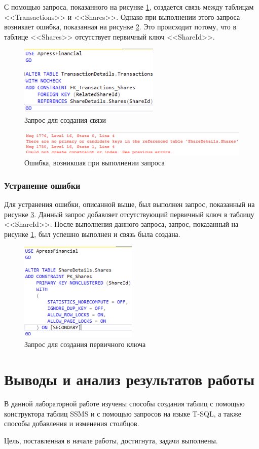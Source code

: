 \documentclass[a4paper, 14pt]{extarticle}
\begin{document}
С помощью запроса, показанного на рисунке \ref{fig:task-7-1}, создается связь
между таблицам <<Transactions>> и <<Shares>>. Однако при выполнении этого запроса
возникает ошибка, показанная на рисунке \ref{fig:task-7-2}. Это происходит
потому, что в таблице <<Shares>> отсутствует первичный ключ <<ShareId>>.

\begin{figure}[H]
  \centering
  \includegraphics[width=0.6\textwidth]{images/task-7/1.png}
  \caption{Запрос для создания связи}
  \label{fig:task-7-1}
\end{figure}

\begin{figure}[H]
  \centering
  \includegraphics[width=\textwidth]{images/task-7/2.png}
  \caption{Ошибка, возникшая при выполнении запроса}
  \label{fig:task-7-2}
\end{figure}

\subsubsection{Устранение ошибки}

Для устранения ошибки, описанной выше, был выполнен запрос, показанный на
рисунке \ref{fig:task-7-3}. Данный запрос добавляет отсутствующий первичный ключ
в таблицу <<ShareId>>. После выполнения данного запроса, запрос, показанный на
рисунке \ref{fig:task-7-1}, был успешно выполнен и связь была создана.

\begin{figure}[H]
  \centering
  \includegraphics[width=0.5\textwidth]{images/task-7/3.png}
  \caption{Запрос для создания первичного ключа}
  \label{fig:task-7-3}
\end{figure}

\section{Выводы и анализ результатов работы}

В данной лабораторной работе изучены способы создания таблиц с помощью
конструктора таблиц SSMS и с помощью запросов на языке T-SQL, а также способы
добавления и изменения столбцов.

Цель, поставленная в начале работы, достигнута, задачи выполнены.
\end{document}
